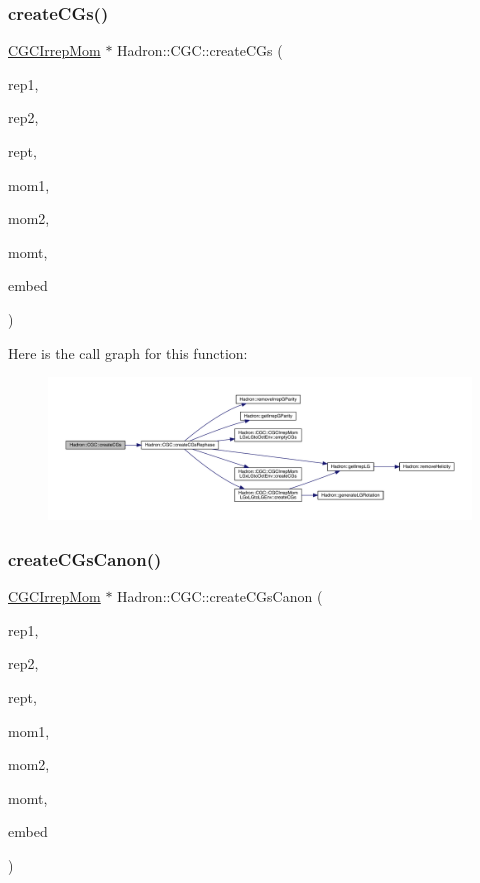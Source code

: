 \subsubsection{\texorpdfstring{createCGs()}{createCGs()}}
{\footnotesize\ttfamily \mbox{\hyperlink{classHadron_1_1CGCIrrepMom}{C\+G\+C\+Irrep\+Mom}} $\ast$ Hadron\+::\+C\+G\+C\+::create\+C\+Gs (\begin{DoxyParamCaption}\item[{const std\+::string \&}]{rep1,  }\item[{const std\+::string \&}]{rep2,  }\item[{const std\+::string \&}]{rept,  }\item[{const Array\+Int \&}]{mom1,  }\item[{const Array\+Int \&}]{mom2,  }\item[{const Array\+Int \&}]{momt,  }\item[{int}]{embed }\end{DoxyParamCaption})}

Here is the call graph for this function\+:\nopagebreak
\begin{figure}[H]
\begin{center}
\leavevmode
\includegraphics[width=350pt]{d9/d19/namespaceHadron_1_1CGC_a3a95d08c25d8f09a43db0baca8c13e6f_cgraph}
\end{center}
\end{figure}
\mbox{\label{namespaceHadron_1_1CGC_a416e4eef9b4975ce970e2e0ff04a09e6}} 
\subsubsection{\texorpdfstring{createCGsCanon()}{createCGsCanon()}}
{\footnotesize\ttfamily \mbox{\hyperlink{classHadron_1_1CGCIrrepMom}{C\+G\+C\+Irrep\+Mom}} $\ast$ Hadron\+::\+C\+G\+C\+::create\+C\+Gs\+Canon (\begin{DoxyParamCaption}\item[{const std\+::string \&}]{rep1,  }\item[{const std\+::string \&}]{rep2,  }\item[{const std\+::string \&}]{rept,  }\item[{const Array\+Int \&}]{mom1,  }\item[{const Array\+Int \&}]{mom2,  }\item[{const Array\+Int \&}]{momt,  }\item[{int}]{embed }\end{DoxyParamCaption})}

